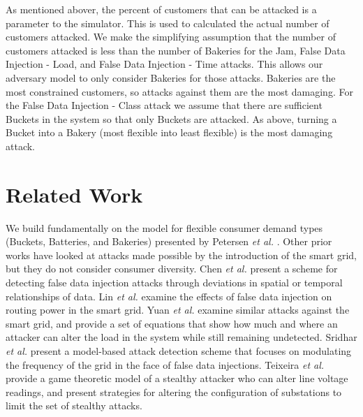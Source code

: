 \documentclass[conference]{IEEEtran}
\begin{document}
As mentioned abover, the percent of customers that can be attacked is a parameter to the simulator.  This is used to calculated the actual number of customers attacked.  We make the simplifying assumption that the number of customers attacked is less than the number of Bakeries for the Jam, False Data Injection - Load, and False Data Injection - Time attacks.  This allows our adversary model to only consider Bakeries for those attacks.  Bakeries are the most constrained customers, so attacks against them are the most damaging.  For the False Data Injection - Class attack we assume that there are sufficient Buckets in the system so that only Buckets are attacked.  As above, turning a Bucket into a Bakery (most flexible into least flexible) is the most damaging attack.




\section{Related Work}
\label{Related Work}

We build fundamentally on the model for flexible consumer demand types (Buckets, Batteries, and Bakeries) presented by Petersen {\em et al.} \cite{petersen2013taxonomy}. 
Other prior works have looked at attacks made possible by the introduction of the smart grid, but they do not consider consumer diversity. Chen {\em et al.} \cite{chen2015detection} present a scheme for detecting false data injection attacks through deviations in spatial or temporal relationships of data. Lin {\em et al.} \cite{lin2012false} examine the effects of false data injection on routing power in the smart grid. Yuan {\em et al.} \cite{yuan2011modeling} examine similar attacks against the smart grid, and provide a set of equations that show how much and where an attacker can alter the load in the system while still remaining undetected. Sridhar {\em et al.} \cite{sridhar2014model} present a model-based attack detection scheme that focuses on modulating the frequency of the grid in the face of false data injections. Teixeira {\em et al.} \cite{teixeira2014security} provide a game theoretic model of a stealthy attacker who can alter line voltage readings, and present strategies for altering the configuration of substations to limit the set of stealthy attacks. 
\end{document}
